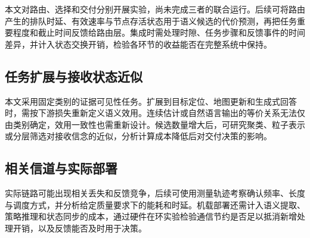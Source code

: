 本文对路由、选择和交付分别开展实验，尚未完成三者的联合运行。后续可将路由产生的排队时延、有效速率与节点存活状态用于语义候选的代价预测，再把任务重要程度和截止时间反馈给路由层。集成时需处理时隙、任务步骤和反馈事件的时间差异，并计入状态交换开销，检验各环节的收益能否在完整系统中保持。

\subsection{任务扩展与接收状态近似}

本文采用固定类别的证据可见性任务。扩展到目标定位、地图更新和生成式回答时，需按下游损失重新定义语义效用。连续估计或自然语言输出的等价关系无法仅由类别确定，效用一致性也需重新设计。候选数量增大后，可研究聚类、粒子表示或分层筛选对接收信念的近似，分析计算成本降低后对交付决策的影响。

\subsection{相关信道与实际部署}

实际链路可能出现相关丢失和反馈竞争，后续可使用测量轨迹考察确认频率、长度与调度方式，并分析给定质量要求下的能耗和时延。机载部署还需计入语义提取、策略推理和状态同步的成本，通过硬件在环实验检验通信节约是否足以抵消新增处理开销，以及反馈能否及时用于决策。
